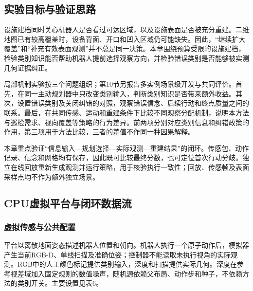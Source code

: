 \documentclass[11pt,a4paper]{article}
\numberwithin{equation}{section}
\begin{document}
\hypertarget{ux5b9eux9a8cux76eeux6807ux4e0eux9a8cux8bc1ux601dux8def}{%
\subsection{实验目标与验证思路}\label{ux5b9eux9a8cux76eeux6807ux4e0eux9a8cux8bc1ux601dux8def}}

设施建档同时关心机器人是否看过可达区域，以及设施表面是否被充分重建。二维地图已有较高覆盖时，设备背面、开口和凹入区域仍可能缺失。因此，``继续扩大覆盖''和``补充有效表面观测''并不总是同一决策。本章围绕预算受限的设施建档，检验类别知识能否帮助机器人提前选择观察方向，并检验错误类别是否能够被实测几何证据纠正。

局部机制实验按三个问题组织；第10节另报告多实例场景级开发与共同评价。首先，在同一主动规划器中只改变类别输入，判断类别知识是否带来额外收益。其次，设置错误类别及关闭纠错的对照，观察错误信念、后续行动和终点质量之间的联系。最后，在共同传感、运动和重建条件下比较不同观察分配机制，说明本方法与巡检需求、视向覆盖等策略的行为差异。前两项分别对应类别信息和纠错政策的作用，第三项用于方法比较，三者的差值不作同一种因果解释。

本章重点验证``信息输入---规划选择---实际观测---重建结果''的闭环。传感包、动作记录、信念和网格均有保存，因此既可比较最终分数，也可定位首次行动分歧。独立在线回放重新生成观测并运行策略，用于核验执行一致性；回放、传感帧及表面采样点均不作为额外独立场景。

\hypertarget{cpuux865aux62dfux5e73ux53f0ux4e0eux95edux73afux6570ux636eux6d41}{%
\subsection{CPU虚拟平台与闭环数据流}\label{cpuux865aux62dfux5e73ux53f0ux4e0eux95edux73afux6570ux636eux6d41}}

\hypertarget{ux865aux62dfux4f20ux611fux4e0eux516cux5171ux914dux7f6e}{%
\subsubsection{虚拟传感与公共配置}\label{ux865aux62dfux4f20ux611fux4e0eux516cux5171ux914dux7f6e}}

平台以离散地面姿态描述机器人位置和朝向。机器人执行一个原子动作后，模拟器产生当前RGB-D、单线扫描及准确位姿；控制器不能读取未执行视角的实际观测。RGB中的人工颜色标记提供类别输入，深度和扫描提供实际几何。深度在参考视差域加入固定规则的数值噪声，随机源依赖父布局、动作步和种子，不依赖方法的类别开关。主要设置见表6。
\end{document}
